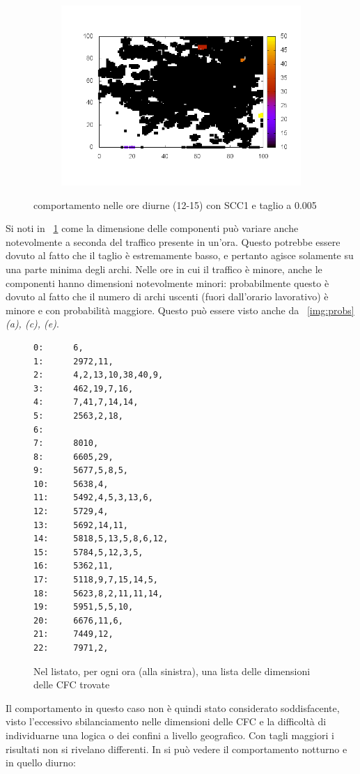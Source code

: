 \documentclass[10pt,a4paper]{article}
\begin{document}
\begin{figure}
\begin{subfigure}[b]{1\textwidth}
\includegraphics[scale=.5]{./img/stampe/scc1/15.png}
\end{subfigure}
\caption{comportamento nelle ore diurne (12-15) con SCC1 e taglio a 0.005}
\end{figure}
Si noti in ~\ref{list:scc1_0-005} come la dimensione delle componenti può variare anche notevolmente a seconda del traffico presente in un'ora. Questo potrebbe essere dovuto al fatto che il taglio è estremamente basso, e pertanto agisce solamente su una parte minima degli archi. Nelle ore in cui il traffico è minore, anche le componenti hanno dimensioni notevolmente minori: probabilmente questo è dovuto al fatto che il numero di archi uscenti (fuori dall'orario lavorativo) è minore e con probabilità maggiore. Questo può essere visto anche da ~\ref{img:probs}\emph{(a), (c), (e)}.
\begin{figure}
\begin{verbatim}
0:      6,
1:      2972,11,
2:      4,2,13,10,38,40,9,
3:      462,19,7,16,
4:      7,41,7,14,14,
5:      2563,2,18,
6:
7:      8010,
8:      6605,29,
9:      5677,5,8,5,
10:     5638,4,
11:     5492,4,5,3,13,6,
12:     5729,4,
13:     5692,14,11,
14:     5818,5,13,5,8,6,12,
15:     5784,5,12,3,5,
16:     5362,11,
17:     5118,9,7,15,14,5,
18:     5623,8,2,11,11,14,
19:     5951,5,5,10,
20:     6676,11,6,
21:     7449,12,
22:     7971,2,
\end{verbatim}
\caption{Nel listato, per ogni ora (alla sinistra), una lista delle dimensioni delle CFC trovate}
\label{list:scc1_0-005}
\end{figure}
Il comportamento in questo caso non è quindi stato considerato soddisfacente, visto l'eccessivo sbilanciamento nelle dimensioni delle CFC e la difficoltà di individuarne una logica o dei confini a livello geografico.
Con tagli maggiori i risultati non si rivelano differenti. In \label{scc1_0-05_night} si può vedere il comportamento notturno e in \label{scc1_0-05_day} quello diurno: 
\end{document}
